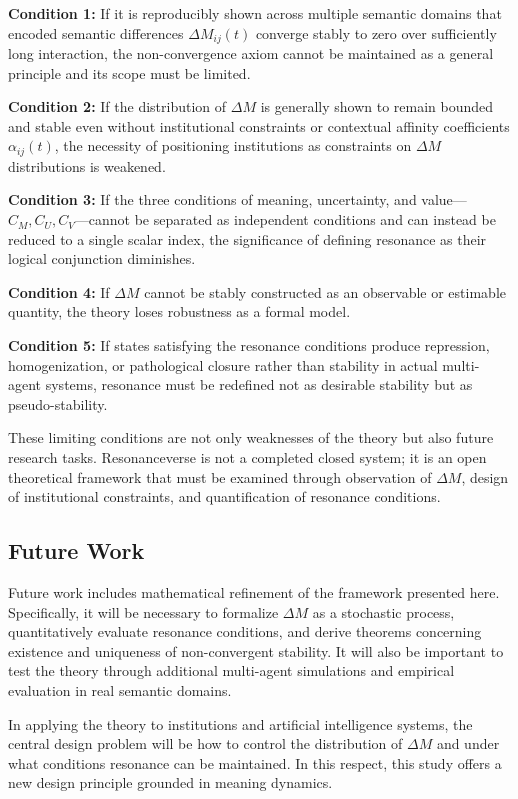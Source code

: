 \documentclass[11pt,a4paper]{article}
\theoremstyle{definition}
\begin{document}
\textbf{Condition 1:} If it is reproducibly shown across multiple semantic domains that encoded semantic differences $\Delta M_{ij}(t)$ converge stably to zero over sufficiently long interaction, the non-convergence axiom cannot be maintained as a general principle and its scope must be limited.

\textbf{Condition 2:} If the distribution of $\Delta M$ is generally shown to remain bounded and stable even without institutional constraints or contextual affinity coefficients $\alpha_{ij}(t)$, the necessity of positioning institutions as constraints on $\Delta M$ distributions is weakened.

\textbf{Condition 3:} If the three conditions of meaning, uncertainty, and value---$C_M, C_U, C_V$---cannot be separated as independent conditions and can instead be reduced to a single scalar index, the significance of defining resonance as their logical conjunction diminishes.

\textbf{Condition 4:} If $\Delta M$ cannot be stably constructed as an observable or estimable quantity, the theory loses robustness as a formal model.

\textbf{Condition 5:} If states satisfying the resonance conditions produce repression, homogenization, or pathological closure rather than stability in actual multi-agent systems, resonance must be redefined not as desirable stability but as pseudo-stability.

These limiting conditions are not only weaknesses of the theory but also future research tasks. Resonanceverse is not a completed closed system; it is an open theoretical framework that must be examined through observation of $\Delta M$, design of institutional constraints, and quantification of resonance conditions.

\subsection{Future Work}

Future work includes mathematical refinement of the framework presented here. Specifically, it will be necessary to formalize $\Delta M$ as a stochastic process, quantitatively evaluate resonance conditions, and derive theorems concerning existence and uniqueness of non-convergent stability. It will also be important to test the theory through additional multi-agent simulations and empirical evaluation in real semantic domains.

In applying the theory to institutions and artificial intelligence systems, the central design problem will be how to control the distribution of $\Delta M$ and under what conditions resonance can be maintained. In this respect, this study offers a new design principle grounded in meaning dynamics.
\end{document}
